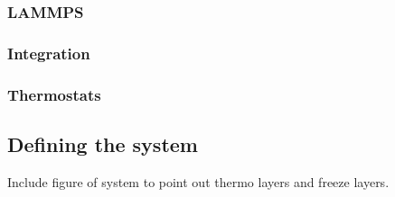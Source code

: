 








\subsubsection{LAMMPS}
\subsubsection{Integration}
\subsubsection{Thermostats}



\subsection{Defining the system}
Include figure of system to point out thermo layers and freeze layers.


